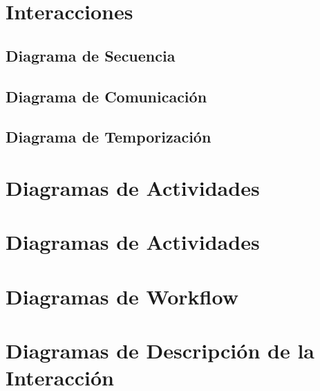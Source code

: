 \newpage

\section{Interacciones}

\newpage

\subsection{Diagrama de Secuencia}

\newpage

\subsection{Diagrama de Comunicación}

\newpage

\subsection{Diagrama de Temporización}

\newpage

\section{Diagramas de Actividades}

\newpage

\section{Diagramas de Actividades}

\newpage

\section{Diagramas de Workflow}

\newpage

\section{Diagramas de Descripción de la Interacción}

\newpage

